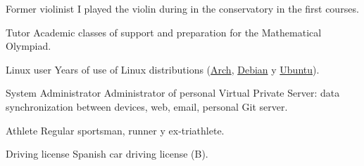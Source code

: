 

\cvachievement{\faMusic}
{Former violinist \smallskip}
{\small {}%
  \small{}}
I played the violin during in the conservatory in the first courses.

\divider

\cvachievement{\faGroup}
{Tutor \smallskip}
{Academic classes of support and preparation for the Mathematical Olympiad.}

\divider

\cvachievement{\faLinux}
{Linux user \smallskip}
{Years of use of Linux distributions (\href{https://www.archlinux.org/}{Arch},
\href{https://www.debian.org/}{Debian} y \href{https://ubuntu.com/}{Ubuntu}).}

\divider

\cvachievement{\faServer}
{System Administrator}
{Administrator of personal Virtual Private Server: data synchronization between
devices, web, email, personal Git server.}

\divider

\cvachievement{\faHeartbeat}
{Athlete \smallskip}
{Regular sportsman, runner y ex-triathlete.}

\divider

\cvachievement{\faCar}
{Driving license \smallskip}
{\small {}%
  \small{}}
Spanish car driving license (B).
